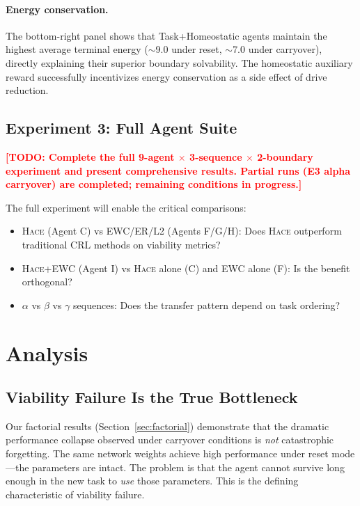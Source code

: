 \documentclass{article}
\newcommand{\todo}[1]{\textcolor{red}{\textbf{[TODO: #1]}}}
\newcommand{\hace}{\textsc{Hace}}
\begin{document}
\paragraph{Energy conservation.}
The bottom-right panel shows that Task+Homeostatic agents maintain the
highest average terminal energy ($\sim$9.0 under reset, $\sim$7.0 under
carryover), directly explaining their superior boundary solvability.
The homeostatic auxiliary reward successfully incentivizes energy
conservation as a side effect of drive reduction.

\subsection{Experiment 3: Full Agent Suite}
\label{sec:full_suite}

\todo{Complete the full 9-agent $\times$ 3-sequence $\times$ 2-boundary
experiment and present comprehensive results. Partial runs (E3 alpha
carryover) are completed; remaining conditions in progress.}

The full experiment will enable the critical comparisons:
\begin{itemize}[leftmargin=*,topsep=1pt,itemsep=1pt]
  \item \hace{} (Agent C) vs EWC/ER/L2 (Agents F/G/H): Does \hace{}
        outperform traditional CRL methods on viability metrics?
  \item \hace{}+EWC (Agent I) vs \hace{} alone (C) and EWC alone (F):
        Is the benefit orthogonal?
  \item $\alpha$ vs $\beta$ vs $\gamma$ sequences: Does the transfer
        pattern depend on task ordering?
\end{itemize}

\section{Analysis}
\label{sec:analysis}

\subsection{Viability Failure Is the True Bottleneck}

Our factorial results (Section~\ref{sec:factorial}) demonstrate that the
dramatic performance collapse observed under carryover conditions is
\emph{not} catastrophic forgetting. The same network weights achieve
high performance under reset mode---the parameters are intact. The problem
is that the agent cannot survive long enough in the new task to
\emph{use} those parameters. This is the defining characteristic of
viability failure.
\end{document}

